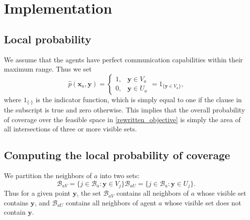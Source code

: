 \section{Implementation}
\subsection{Local probability}
We assume that the agents have perfect communication capabilities within their maximum range. Thus we set
\begin{equation}
  \hat{p}(\mathbf{x}_{a}, \mathbf{y}) = \begin{cases}
    1, &\mathbf{y}\in V_{a}\\
    0, &\mathbf{y}\in U_{a}
  \end{cases} = 1_{\big\{\mathbf{y}\in V_{a}\big\}},
\end{equation}
where $1_{\{\cdot\}}$ is the indicator function, which is simply equal to one if the clause in the subscript is true and zero otherwise.
This implies that the overall probability of coverage over the feasible space in \eqref{rewritten_objective} is simply the area of all intersections of three or more visible sets.

\subsection{Computing the local probability of coverage}
We partition the neighbors of $a$ into two sets:
\begin{subequations}
  \begin{equation}
    \mathcal{B}_{a V} = \{j\in\mathcal{B}_{a}: \mathbf{y}\in V_{j}\}
  \end{equation}
  \begin{equation}
    \mathcal{B}_{a U} = \{j\in\mathcal{B}_{a}: \mathbf{y}\in U_{j}\}.
  \end{equation}
\end{subequations}
Thus for a given point $\mathbf{y}$, the set $\mathcal{B}_{a V}$ contains all neighbors of $a$ whose visible set contains $\mathbf{y}$,
and $\mathcal{B}_{a U}$ contains all neighbors of agent $a$ whose visible set does not contain $\mathbf{y}$.

